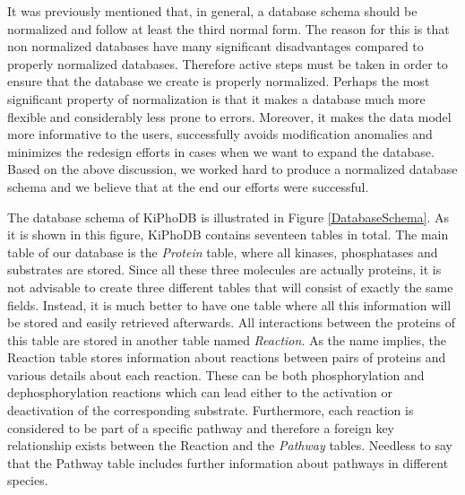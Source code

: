 It was previously mentioned that, in general, a database schema should be normalized and follow at least the third normal form.
The reason for this is that non normalized databases have many significant disadvantages compared to properly normalized databases.
Therefore active steps must be taken in order to ensure that the database we create is properly normalized.
Perhaps the most significant property of normalization is that it makes a database much more flexible and considerably less prone to errors.
Moreover, it makes the data model more informative to the users, successfully avoids modification anomalies and minimizes the redesign efforts in cases when we want to expand the database.
Based on the above discussion, we worked hard to produce a normalized database schema and we believe that at the end our efforts were successful.

The database schema of KiPhoDB is illustrated in Figure \ref{DatabaseSchema}.
As it is shown in this figure, KiPhoDB contains seventeen tables in total.
The main table of our database is the \textsl{Protein} table, where all kinases, phosphatases and substrates are stored.
Since all these three molecules are actually proteins, it is not advisable to create three different tables that will consist of exactly the same fields.
Instead, it is much better to have one table where all this information will be stored and easily retrieved afterwards.
All interactions between the proteins of this table are stored in another table named \textsl{Reaction}.
As the name implies, the Reaction table stores information about reactions between pairs of proteins and various details about each reaction.
These can be both phosphorylation and dephosphorylation reactions which can lead either to the activation or deactivation of the corresponding substrate.
Furthermore, each reaction is considered to be part of a specific pathway and therefore a foreign key relationship exists between the Reaction and the \textsl{Pathway} tables.
Needless to say that the Pathway table includes further information about pathways in different species.

